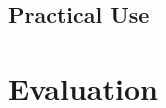 \documentclass{mproj}
\begin{document}







\section{Practical Use}
\chapter{Evaluation}\label{evaluation}






\end{document}

